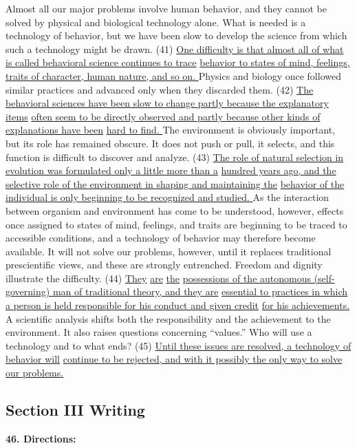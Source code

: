 \documentclass[UTF8,11pt]{ctexart}
\begin{document}
Almost all our major problems involve human behavior, and they cannot be solved by physical and biological technology alone. What is needed is a technology of behavior, but we have been slow to develop the science from which such a technology might be drawn. (41) \uline{One difficulty is that almost all of what is called behavioral science continues to trace} \uline{behavior to states of mind, feelings, traits of character, human nature, and so on. }Physics and biology once followed similar practices and advanced only when they discarded them. (42) \uline{The behavioral sciences have been slow to change partly because the explanatory items} \uline{often seem to be directly observed and partly because other kinds of explanations have been} \uline{hard to find. }The environment is obviously important, but its role has remained obscure. It does not push or pull, it selects, and this function is difficult to discover and analyze. (43) \uline{The role of natural selection in evolution was formulated only a little more than a} \uline{hundred years ago, and the selective role of the environment in shaping and maintaining the} \uline{behavior of the individual is only beginning to be recognized and studied. }As the interaction between organism and environment has come to be understood, however, effects once assigned to states of mind, feelings, and traits are beginning to be traced to accessible conditions, and a technology of behavior may therefore become available. It will not solve our problems, however, until it replaces traditional prescientific views, and these are strongly entrenched. Freedom and dignity illustrate the difficulty. (44) \uline{They} \uline{are} \uline{the} \uline{possessions of the autonomous (self-governing) man of traditional theory, and they are} \uline{essential to practices in which a person is held responsible for his conduct and given credit} \uline{for his achievements. }A scientific analysis shifts both the responsibility and the achievement to the environment. It also raises questions concerning “values.” Who will use a technology and to what ends? (45) \uline{Until these issues are resolved, a technology of behavior will} \uline{continue to be rejected, and with it possibly the only way to solve our problems.}


\subsection*{\textbf{Section III Writing}}


\textbf{46. Directions:}
\end{document}
